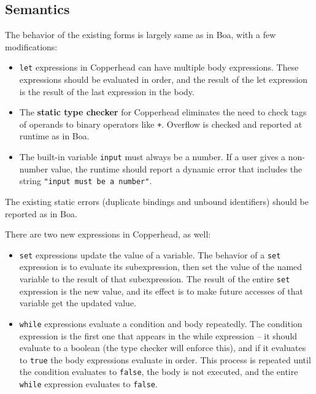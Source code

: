 \documentclass[10pt, oneside]{article}
\begin{document}
\subsection*{Semantics}

The behavior of the existing forms is largely same as in Boa, with a few
modifications:

\begin{itemize}
\item \texttt{let} expressions in Copperhead can have multiple body
expressions. These expressions should be evaluated in order, and the result
of the let expression is the result of the last expression in the body.
\item The {\bf static type checker} for Copperhead eliminates the need to check
tags of operands to binary operators like \texttt{+}. Overflow is
checked and reported at runtime as in Boa.
\item The built-in variable \texttt{input} must always be a number. If a user
gives a non-number value, the runtime should report a dynamic error that
includes the string \texttt{"input must be a number"}.
\end{itemize}

The existing static errors (duplicate bindings and unbound identifiers)
should be reported as in Boa.

There are two new expressions in Copperhead, as well:

\begin{itemize}

\item \texttt{set} expressions update the value of a variable. The behavior
of a \texttt{set} expression is to evaluate its subexpression, then set the
value of the named variable to the result of that subexpression. The result
of the entire \texttt{set} expression is the new value, and its effect is to
make future accesses of that variable get the updated value.

\item \texttt{while} expressions evaluate a condition and body repeatedly.
The condition expression is the first one that appears in the while
expression -- it should evaluate to a boolean (the type checker will enforce
this), and if it evaluates to \texttt{true} the body expressions evaluate in
order. This process is repeated until the condition evaluates to
\texttt{false}, the body is not executed, and the entire \texttt{while}
expression evaluates to \texttt{false}.

\end{itemize}
\end{document}
